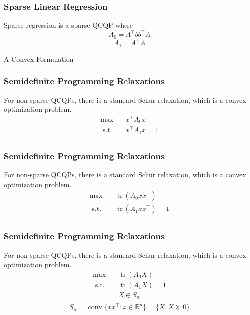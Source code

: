 \documentclass{beamer}
\newcommand{\R}{\mathbb{R}}
\DeclareMathOperator{\conv}{\operatorname{conv}}
\DeclareMathOperator{\tr}{tr}
\newcommand{\st}{{\text{ s.t. }}}
\begin{document}
\begin{frame}
    \frametitle{Sparse Linear Regression}
    Sparse regression is a sparse QCQP where
    \[
        A_0 = A^{\intercal}bb^{\intercal}A
    \]
    \[
        A_1 = A^{\intercal}A
    \]
\end{frame}
\begin{frame}
    \centering
    \huge
    {\color{gray}A Convex Formulation}
\end{frame}
\begin{frame}
\frametitle{Semidefinite Programming Relaxations}
    For non-sparse QCQPs, there is a standard Schur relaxation, which is a convex
    optimization problem.
    \begin{equation}
        \begin{aligned}
            \max\quad & x^{\intercal}A_0x\\
            \st & x^{\intercal}A_1x = 1\\
        \end{aligned}
    \end{equation}
\end{frame}
\begin{frame}
\frametitle{Semidefinite Programming Relaxations}
    For non-sparse QCQPs, there is a standard Schur relaxation, which is a convex
    optimization problem.
    \begin{equation}
        \begin{aligned}
            \max\quad & \tr(A_0xx^{\intercal})\\
            \st & \tr(A_1xx^{\intercal}) = 1\\
        \end{aligned}
    \end{equation}
\end{frame}
\begin{frame}
\frametitle{Semidefinite Programming Relaxations}
    For non-sparse QCQPs, there is a standard Schur relaxation, which is a convex
    optimization problem.
    \begin{equation}
        \begin{aligned}
            \max\quad & \tr(A_0X)\\
            \st & \tr(A_1X) = 1\\
                & X \in S_n\\
        \end{aligned}
    \end{equation}
    \pause 
    \[
        S_n = \conv \{ xx^{\intercal} : x \in \R^n\} = \{X : X \succeq 0\}
    \]
\end{frame}
\end{document}
